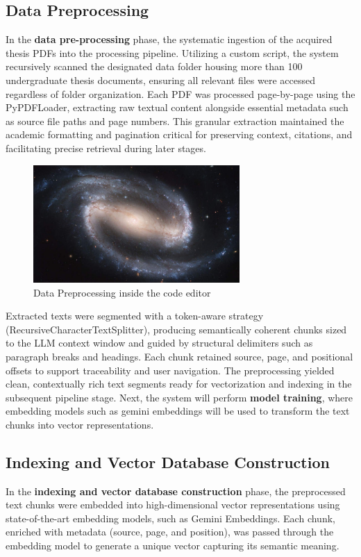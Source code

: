 \begin{refsection}
\subsection{Data Preprocessing}
In the \textbf{data pre-processing} phase, the systematic ingestion of the acquired thesis PDFs into the processing pipeline. Utilizing a custom script, the system recursively scanned the designated data folder housing more than 100 undergraduate thesis documents, ensuring all relevant files were accessed regardless of folder organization. Each PDF was processed page-by-page using the PyPDFLoader, extracting raw textual content alongside essential metadata such as source file paths and page numbers. This granular extraction maintained the academic formatting and pagination critical for preserving context, citations, and facilitating precise retrieval during later stages.
\begin{figure}[h]
    \centering
    \includegraphics[width=0.7\textwidth]{figures/sampleFig1.jpg}
    \caption{Data Preprocessing inside the code editor}
\end{figure}
Extracted texts were segmented with a token-aware strategy (RecursiveCharacterTextSplitter), producing semantically coherent chunks sized to the LLM context window and guided by structural delimiters such as paragraph breaks and headings. Each chunk retained source, page, and positional offsets to support traceability and user navigation. The preprocessing yielded clean, contextually rich text segments ready for vectorization and indexing in the subsequent pipeline stage.
Next, the system will perform \textbf{model training}, where embedding models such as gemini embeddings will be used to transform the text chunks into vector representations.

\subsection{Indexing and Vector Database Construction}
In the \textbf{indexing and vector database construction} phase, the preprocessed text chunks were embedded into high-dimensional vector representations using state-of-the-art embedding models, such as Gemini Embeddings. Each chunk, enriched with metadata (source, page, and position), was passed through the embedding model to generate a unique vector capturing its semantic meaning.


\end{refsection}
